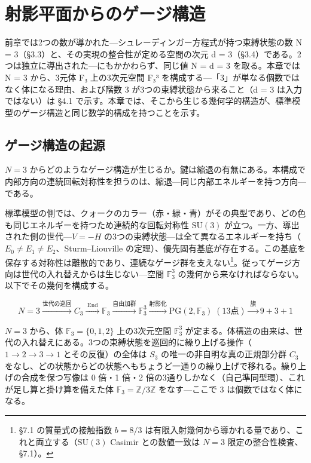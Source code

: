 \documentclass[fontsize=11pt,paper=a4,lualatex]{jlreq}
\begin{document}
\section{射影平面からのゲージ構造}\label{ux5c04ux5f71ux5e73ux9762ux304bux3089ux306eux30b2ux30fcux30b8ux69cbux9020}

前章では2つの数が導かれた---シュレーディンガー方程式が持つ束縛状態の数 N = 3（§3.3）と、その実現の整合性が定める空間の次元 d = 3（§3.4）である。2つは独立に導出された---にもかかわらず、同じ値 N = d = 3 を取る。本章では N = 3 から、3元体 F₃ 上の3次元空間 F₃³ を構成する---「3」が単なる個数ではなく体になる理由、および階数 3 が3つの束縛状態から来ること（d = 3 は入力ではない）は §4.1 で示す。本章では、そこから生じる幾何学的構造が、標準模型のゲージ構造と同じ数学的構成を持つことを示す。

\subsection{ゲージ構造の起源}\label{ux30b2ux30fcux30b8ux69cbux9020ux306eux8d77ux6e90}

$N = 3$ からどのようなゲージ構造が生じるか。鍵は縮退の有無にある。本構成で内部方向の連続回転対称性を担うのは、縮退---同じ内部エネルギーを持つ方向---である。

標準模型の側では、クォークのカラー（赤・緑・青）がその典型であり、どの色も同じエネルギーを持つため連続的な回転対称性 $\mathrm{SU}(3)$ が立つ。一方、導出された側の世代---$V = -H$ の3つの束縛状態---は全て異なるエネルギーを持ち（$E_0 \neq E_1 \neq E_2$、Sturm--Liouville の定理）、優先固有基底が存在する。この基底を保存する対称性は離散的であり、連続なゲージ群を支えない\footnote{§7.1 の質量式の接触指数 $b = 8/3$ は有限入射幾何から導かれる量であり、これと両立する（$\mathrm{SU}(3)$ Casimir との数値一致は $N = 3$ 限定の整合性検査、§7.1）。}。従ってゲージ方向は世代の入れ替えからは生じない---空間 $\mathbb{F}_3^3$ の幾何から来なければならない。以下でその幾何を構成する。

\[N = 3 \xrightarrow{\text{世代の巡回}} C_3 \xrightarrow{\;\mathrm{End}\;} \mathbb{F}_3 \xrightarrow{\text{自由加群}} \mathbb{F}_3^3 \xrightarrow{\text{射影化}} \mathrm{PG}(2,\mathbb{F}_3)\;(13\text{点}) \xrightarrow{\;\text{旗}\;} 9{+}3{+}1\]

$N = 3$ から、体 $\mathbb{F}_3 = \{0, 1, 2\}$ 上の3次元空間 $\mathbb{F}_3^3$ が定まる。体構造の由来は、世代の入れ替えにある。3つの束縛状態を巡回的に繰り上げる操作（$1 \to 2 \to 3 \to 1$ とその反復）の全体は $S_3$ の唯一の非自明な真の正規部分群 $C_3$ をなし、どの状態からどの状態へもちょうど一通りの繰り上げで移れる。繰り上げの合成を保つ写像は 0 倍・1 倍・2 倍の3通りしかなく（自己準同型環）、これが足し算と掛け算を備えた体 $\mathbb{F}_3 = \mathbb{Z}/3\mathbb{Z}$ をなす---ここで 3 は個数ではなく体になる。
\end{document}
